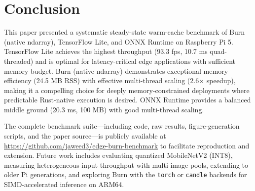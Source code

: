 \documentclass[conference]{IEEEtran}
\begin{document}
\section{Conclusion}
\label{sec:conclusion}

This paper presented a systematic steady-state warm-cache benchmark of Burn (native ndarray), TensorFlow Lite, and ONNX Runtime on Raspberry Pi 5. TensorFlow Lite achieves the highest throughput (93.3 fps, 10.7 ms quad-threaded) and is optimal for latency-critical edge applications with sufficient memory budget. Burn (native ndarray) demonstrates exceptional memory efficiency (24.5 MB RSS) with effective multi-thread scaling (2.6$\times$ speedup), making it a compelling choice for deeply memory-constrained deployments where predictable Rust-native execution is desired. ONNX Runtime provides a balanced middle ground (20.3 ms, 100 MB) with good multi-thread scaling.

The complete benchmark suite---including code, raw results, figure-generation scripts, and the paper source---is publicly available at \url{https://github.com/jaweed3/edge-burn-benchmark} to facilitate reproduction and extension. Future work includes evaluating quantized MobileNetV2 (INT8), measuring heterogeneous-input throughput with multi-image pools, extending to older Pi generations, and exploring Burn with the \texttt{torch} or \texttt{candle} backends for SIMD-accelerated inference on ARM64.
\end{document}
